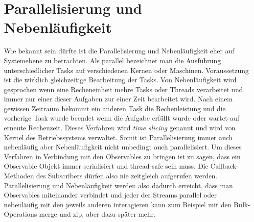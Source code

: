 \section{Parallelisierung und Nebenläufigkeit}
Wie bekannt sein dürfte ist die Parallelisierung und Nebenläufigkeit eher auf Systemebene zu betrachten. Als parallel bezeichnet man die Ausführung unterschiedlicher Tasks auf verschiedenen Kernen oder Maschinen. Voraussetzung ist die wirklich gleichzeitige Bearbeitung der Tasks. Von Nebenläufigkeit wird gesprochen wenn eine Recheneinheit mehre Tasks oder Threads verarbeitet und immer nur einer dieser Aufgaben zur einer Zeit bearbeitet wird. Nach einem gewissen Zeitraum bekommt ein anderen Task die Rechenleistung und die vorherige Task wurde beendet wenn die Aufgabe erfüllt wurde oder wartet auf erneute Rechenzeit. Dieses Verfahren wird \textit{time slicing} genannt und wird von Kernel des Betriebssystems verwaltet. Somit ist Parallelisierung immer auch nebenläufig aber Nebenläufigkeit nicht unbedingt auch parallelisiert. Um dieses Verfahren in Verbindung mit den Observables zu bringen ist zu sagen, dass ein Observable Objekt immer serialisiert und thread-safe sein muss. Die Callback-Methoden des Subscribers dürfen also nie zeitgleich aufgerufen werden. Parallelisierung und Nebenläufigkeit werden also dadurch erreicht, dass man Observables miteinander verbindet und jeder der Streams parallel oder nebenläufig mit den jeweils anderen interagieren kann zum Beispiel mit den Bulk-Operations merge und zip, aber dazu später mehr.
